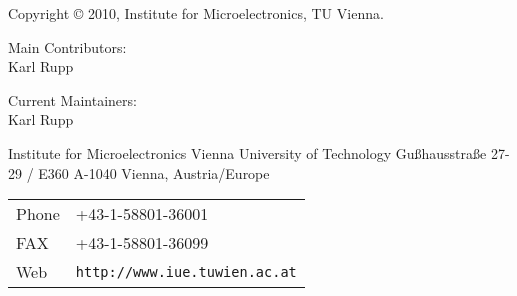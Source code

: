 
\clearpage

Copyright {\copyright} 2010, Institute for Microelectronics, TU Vienna.

\vspace{3.5cm}

Main Contributors:\\ 

Karl Rupp\\

\vspace{3.5cm}

Current Maintainers: \\

Karl Rupp\\


\vspace{7.0cm}

Institute for Microelectronics\newline
Vienna University of Technology\newline
Gu\ss hausstra\ss e 27-29 / E360\newline
A-1040 Vienna, Austria/Europe\newline


\begin{tabular}{ll}
Phone  & +43-1-58801-36001\\
FAX    & +43-1-58801-36099\\
Web    & \texttt{http://www.iue.tuwien.ac.at}
\end{tabular}



